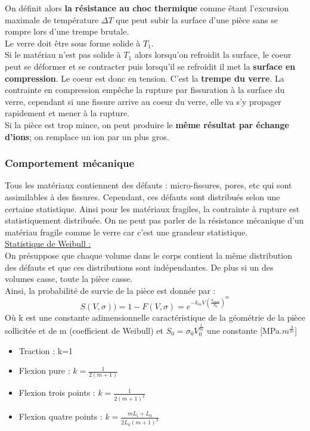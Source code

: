 \documentclass[../main.tex]{subfiles}
\begin{document}
On définit alors \textbf{la résistance au choc thermique} comme étant l'excursion maximale de température $\Delta T$ que peut subir la surface d'une pièce sans se rompre lors d'une trempe brutale.\\
\warning Le verre doit être sous forme solide à $T_1$. \\

Si le matériau n'est pas solide à $T_1$ alors lorsqu'on refroidit la surface, le coeur peut se déformer et se contracter puis lorsqu'il se refroidit il met la \textbf{surface en compression}. Le coeur est donc en tension. C'est la \textbf{trempe du verre}. La contrainte en compression empêche la rupture par fissuration à la surface du verre, cependant si une fissure arrive au coeur du verre, elle va s'y propager rapidement et mener à la rupture.\\

Si la pièce est trop mince, on peut produire le \textbf{même résultat par échange d'ions}; on remplace un ion par un plus gros.\\

\subsubsection{Comportement mécanique}
Tous les matériaux contiennent des défauts : micro-fissures, pores, etc qui sont assimilables à des fissures. Cependant, ces défauts sont distribués selon une certaine statistique. Ainsi pour les matériaux fragiles, la contrainte à rupture est statistiquement distribuée. On ne peut pas parler de la résistance mécanique d'un matériau fragile comme le verre car c'est une grandeur statistique.\\

\quad \underline{Statistique de Weibull :}\\
On présuppose que chaque volume dans le corps contient la même distribution des défauts et que ces distributions sont indépendantes. De plus si un des volumes casse, toute la pièce casse.\\

Ainsi, la probabilité de survie de la pièce est donnée par :\\
\begin{equation}
    S(V, \sigma) ) = 1- F(V,\sigma) = e^{-k_m V (\frac{\sigma_{max}}{S_0})^m}
\end{equation}
Où k est une constante adimensionnelle caractéristique de la géométrie de la pièce sollicitée et de m (coefficient de Weibull) et $S_0 = \sigma_0 V_0^{\frac{1}{m}}$ une constante [MPa.$m^{\frac{3}{m}}$]\\
\begin{itemize}
    \item Traction : k=1\\
    \item Flexion pure : $k=\frac{1}{2(m+1)}$\\
    \item Flexion trois points : $k = \frac{1}{2(m+1)^2}$\\
    \item Flexion quatre points : $k = \frac{mL_i + L_0}{2L_0 (m+1)^2}$
\end{itemize}
\end{document}
